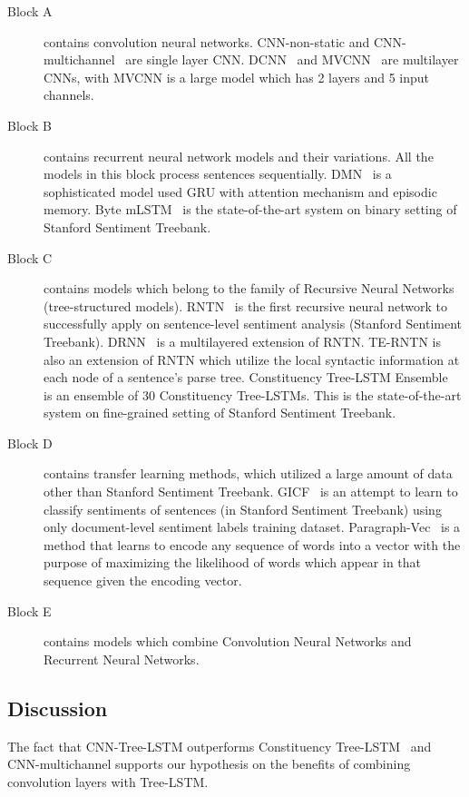 \begin{description}
	\item[Block A] contains convolution neural networks.
	CNN-non-static and CNN-multichannel~\cite{KimCNN} are single layer CNN.
	DCNN~\cite{DCNN} and MVCNN~\cite{2-layer-cnn} are multilayer CNNs, with MVCNN is a large model  which has 2 layers and 5 input channels.
	\item[Block B] contains recurrent neural network models and their variations.
	All the models in this block process sentences sequentially.
	DMN~\cite{attention-gru} is a sophisticated model used GRU with attention mechanism and episodic memory.
	Byte mLSTM~\cite{mlstm} is the state-of-the-art system on binary setting of Stanford Sentiment Treebank.
	\item[Block C] contains models which belong to the family of Recursive Neural Networks (tree-structured models).
	RNTN~\cite{socher2013recursive} is the first recursive neural network to successfully apply on sentence-level sentiment analysis (Stanford Sentiment Treebank).
	DRNN~\cite{IrsoyDRNN} is a multilayered extension of RNTN.
	TE-RNTN is also an extension of RNTN which utilize the local syntactic information at each node of a sentence's parse tree.
	Constituency Tree-LSTM Ensemble~\cite{LooksHHN17} is an ensemble of 30 Constituency Tree-LSTMs.
	This is the state-of-the-art system on fine-grained setting of Stanford Sentiment Treebank.
	\item[Block D] contains transfer learning methods, which utilized a large amount of data other than Stanford Sentiment Treebank.
	GICF~\cite{group-instance} is an attempt to learn to classify sentiments of sentences (in Stanford Sentiment Treebank) using only document-level sentiment labels training dataset.
	Paragraph-Vec~\cite{ParagraphVec} is a method that learns to encode any sequence of words into a vector with the purpose of maximizing the likelihood of words which appear in that sequence given the encoding vector.
	\item[Block E] contains models which combine Convolution Neural Networks and Recurrent Neural Networks.
\end{description}
\subsection{Discussion}
The fact that CNN-Tree-LSTM outperforms Constituency Tree-LSTM~\cite{treeLSTM} and CNN-multichannel\cite{KimCNN} supports our hypothesis on the benefits of combining convolution layers with Tree-LSTM.

